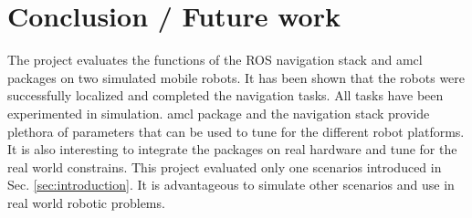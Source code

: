 \documentclass[10pt,journal,compsoc]{IEEEtran}
\begin{document}
\section{Conclusion / Future work}

The project evaluates the functions of the ROS navigation stack and amcl packages on two simulated mobile robots. It has been shown that the robots were successfully localized and completed the navigation tasks. All tasks have been experimented in simulation. amcl package and the navigation stack provide plethora of parameters that can be used to tune for the different robot platforms. It is also interesting  to integrate the packages on real hardware and tune for the real world constrains. This project evaluated only one scenarios introduced in Sec. \ref{sec:introduction}. It is advantageous to simulate other scenarios and use in real world robotic problems. 




\end{document}
